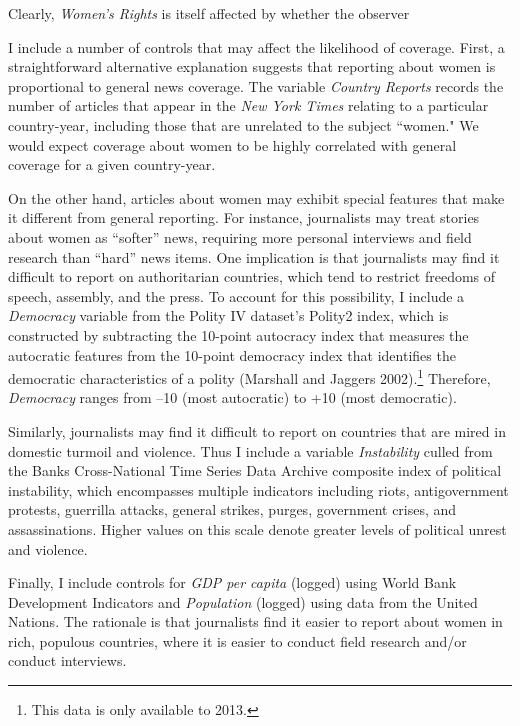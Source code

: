 \documentclass[11pt, oneside]{article}
\begin{document}
Clearly, \emph{Women's Rights} is itself affected by whether the observer

I include a number of controls that may affect the likelihood of coverage. First, a straightforward alternative explanation suggests that reporting about women is proportional to general news coverage. The variable \emph{Country Reports} records the number of articles that appear in the \emph{New York Times} relating to a particular country-year, including those that are unrelated to the subject ``women." We would expect coverage about women to be highly correlated with general coverage for a given country-year.

On the other hand, articles about women may exhibit special features that make it different from general reporting. For instance, journalists may treat stories about women as ``softer'' news, requiring more personal interviews and field research than ``hard'' news items. One implication is that journalists may find it difficult to report on authoritarian countries, which tend to restrict freedoms of speech, assembly, and the press. To account for this possibility, I include a \emph{Democracy} variable from the Polity IV dataset's Polity2 index, which is constructed by subtracting the 10-point autocracy index that measures the autocratic features from the 10-point democracy index that identifies the democratic characteristics of a polity (Marshall and Jaggers 2002).\footnote{\hspace{5}This data is only available to 2013.} Therefore, \emph{Democracy} ranges from --10 (most autocratic) to +10 (most democratic). 

Similarly, journalists may find it difficult to report on countries that are mired in domestic turmoil and violence. Thus I include a variable \emph{Instability} culled from the Banks Cross-National Time Series Data Archive composite index of political instability, which encompasses multiple indicators including riots, antigovernment protests, guerrilla attacks, general strikes, purges, government crises, and assassinations. Higher values on this scale denote greater levels of political unrest and violence. 

Finally, I include controls for \emph{GDP per capita} (logged) using World Bank Development Indicators and \emph{Population} (logged) using data from the United Nations. The rationale is that journalists find it easier to report about women in rich, populous countries, where it is easier to conduct field research and/or conduct interviews. 
\end{document}
